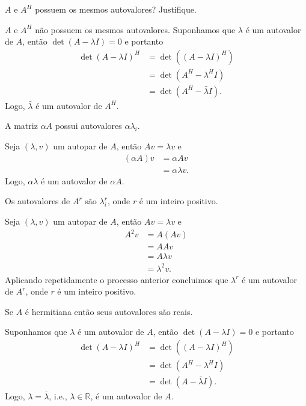 \documentclass[a4paper,12pt, leqno, answers]{exam}
\begin{document}
\begin{questions}
    \question $A$ e $A^H$ possuem os mesmos autovalores? Justifique.
    \begin{solution}
        $A$ e $A^H$ n\~{a}o possuem os mesmos autovalores. Suponhamos que $\lambda$ \'{e} um autovalor de $A$, ent\~{a}o $\det(A - \lambda I) = 0$ e portanto
        \begin{align*}
            \det(A - \lambda I)^H &= \det\left( (A - \lambda I)^H \right) \\
            &= \det(A^H - \lambda^H I) \\
            &= \det(A^H - \bar{\lambda} I).
        \end{align*}
        Logo, $\bar{\lambda}$ \'{e} um autovalor de $A^H$.
    \end{solution}

    \question A matriz $\alpha A$ possui autovalores $\alpha \lambda_i$.
    \begin{solution}
        Seja $(\lambda, v)$ um autopar de $A$, ent\~{a}o $A v = \lambda v$ e
        \begin{align*}
            (\alpha A) v &= \alpha A v \\
            &= \alpha \lambda v.
        \end{align*}
        Logo, $\alpha \lambda$ \'{e} um autovalor de $\alpha A$.
    \end{solution}

    \question Os autovalores de $A^r$ s\~{a}o $\lambda_i^r$, onde $r$ \'{e} um inteiro positivo.
    \begin{solution}
        Seja $(\lambda, v)$ um autopar de $A$, ent\~{a}o $A v = \lambda v$ e
        \begin{align*}
            A^2 v &= A (A v) \\
            &= A A v \\
            &= A \lambda v \\
            &= \lambda^2 v.
        \end{align*}
        Aplicando repetidamente o processo anterior concluimos que $\lambda^r$ \'{e} um autovalor de $A^r$, onde $r$ \'{e} um inteiro positivo.
    \end{solution}

    \question Se $A$ \'{e} hermitiana ent\~{a}o seus autovalores s\~{a}o reais.
    \begin{solution}
        Suponhamos que $\lambda$ \'{e} um autovalor de $A$, ent\~{a}o $\det(A - \lambda I) = 0$ e portanto
        \begin{align*}
            \det(A - \lambda I)^H &= \det\left( (A - \lambda I)^H \right) \\
            &= \det(A^H - \lambda^H I) \\
            &= \det(A - \overline{\lambda} I).
        \end{align*}
        Logo, $\lambda = \overline{\lambda}$, i.e., $\lambda \in \mathbb{R}$, \'{e} um autovalor de $A$.
    \end{solution}


\end{questions}
\end{document}
